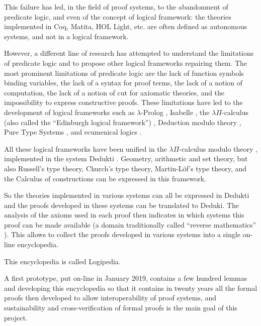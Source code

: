This failure has led, in the field of proof systems, to the
abandonment of predicate logic, and even of the concept of logical
framework: the theories implemented in {\sf Coq}, {\sf Matita}, {\sf
  HOL Light}, etc. are often defined as autonomous systems, and not in
a logical framework.

However, a different line of research has attempted to understand the
limitations of predicate logic and to propose other logical frameworks
repairing them. The most prominent limitations of predicate logic are
the lack of function symbols binding variables, the lack of a syntax
for proof terms, the lack of a notion of computation, the lack of a
notion of cut for axiomatic theories, and the impossibility to express
constructive proofs. These limitations have led to the development of
logical frameworks such as $\lambda$-Prolog \cite{NadathurMiller88,
  MillerNadathur12}, Isabelle \cite{Paulson90}, the $\lambda
\Pi$-calculus (also called the ``Edinburgh logical framework'')
\cite{HarperHonsellPlotkin91}, Deduction modulo theory
\cite{DowekHardinKirchner03, DowekWerner03}, Pure Type Systems
\cite{Berardi88,Terlouw89}, and ecumenical logics
\cite{Prawitz15,Dowek15,PereiraRodriguez17}.

All these logical frameworks have been unified in the $\lambda
\Pi$-calculus modulo theory \cite{CousineauDowek07}, implemented in
the system {\sf Dedukti} \cite{Assaf16}.  Geometry, arithmetic and set
theory, but also Russell's type theory, Church's type theory,
Martin-L\"of's type theory, and the Calculus of constructions can be
expressed in this framework.

So the theories implemented in various systems can all be expressed in
{\sf Dedukti} and the proofs developed in these systems can be
translated to {\sf Deduki}.  The analysis of the axioms used in each
proof then indicates in which systems this proof can be made available
\cite{Thire18,Dowek17} (a domain traditionally called ``reverse
mathematics'' \cite{Friedman76,Simpson09}).  This allows to collect
the proofs developed in various systems into a single on-line
encyclopedia.


This encyclopedia is called {\sf Logipedia}. 

A first prototype, put on-line in January 2019, contains
a few hundred lemmas and developing this encyclopedia so that it
contains in twenty years all the formal proofs then developed to allow
interoperability of proof systems, and sustainability and
cross-verification of formal proofs is the main goal of this project.

